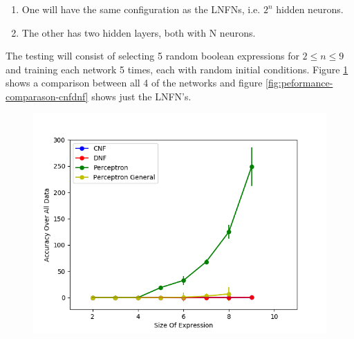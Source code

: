 \begin{enumerate}
	\item One will have the same configuration as the LNFNs, i.e. $2^n$ hidden neurons.
	\item The other has two hidden layers, both with N neurons.
\end{enumerate}

The testing will consist of selecting 5 random boolean expressions for $2 \leq n \leq 9$ and training each network 5 times, each with random initial conditions. Figure \ref{fig:peformance-comparason-all} shows a comparison between all 4 of the networks and figure \ref{fig:peformance-comparason-cnfdnf} shows just the LNFN's.

\begin{figure}[H]
  \centering
  \begin{minipage}[b]{0.8\textwidth}
    \includegraphics[width=\textwidth]{All-Peformance-Comparason.png}
    \caption{}
    \label{fig:peformance-comparason-all}
  \end{minipage}
  \hfill
\end{figure}

